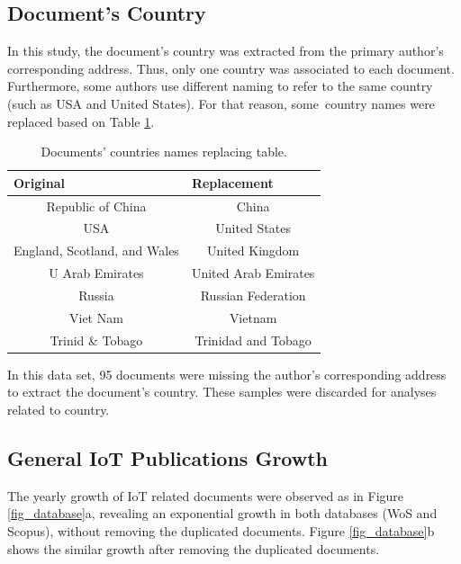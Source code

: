 \documentclass[symmetry,article,accept,moreauthors,pdftex10pt,a4paper]{mdpi}
\begin{document}
\subsection{Document's Country}

In this study, the document's country was extracted from the primary author's corresponding address. Thus, only one country was associated to each document. Furthermore, some authors use different naming to refer to the same country (such as USA and United States). For that reason, some~country names were replaced based on Table \ref{table_countries_rep}.

\begin{table}[H]
	\centering
	\caption{Documents' countries names replacing table.}
	\label{table_countries_rep}
	\begin{tabular}{cc}
		\toprule
		\multicolumn{1}{l}{\textbf{Original}} & \multicolumn{1}{l}{\textbf{Replacement}} \\
		\midrule
		Republic of China & China \\
		USA & United States \\
		England, Scotland, and Wales & United Kingdom \\
		U Arab Emirates & United Arab Emirates \\
		Russia & Russian Federation \\
		Viet Nam & Vietnam \\
		Trinid \& Tobago & Trinidad and Tobago\\
		\bottomrule
	\end{tabular}
\end{table}

In this data set, 95 documents were missing the author's corresponding address to extract the document's country. These samples were discarded for analyses related to country.

\subsection{General IoT Publications Growth}

The yearly growth of IoT related documents were observed as in Figure \ref{fig_database}a, revealing an exponential growth in both databases (WoS and Scopus), without removing the duplicated documents. Figure \ref{fig_database}b shows the similar growth after removing the duplicated documents.  
\end{document}
